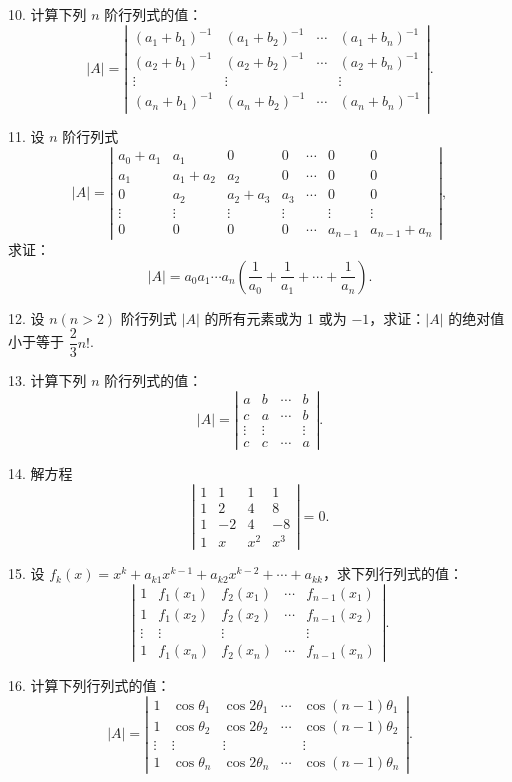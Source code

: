 \documentclass[UTF8,12pt,a4paper,fontset=fandol]{ctexart}
\begin{document}
10. 计算下列 $n$ 阶行列式的值：
\[
|A|=
\left|\begin{array}{cccc}
(a_1+b_1)^{-1}&(a_1+b_2)^{-1}&\cdots&(a_1+b_n)^{-1}\\
(a_2+b_1)^{-1}&(a_2+b_2)^{-1}&\cdots&(a_2+b_n)^{-1}\\
\vdots&\vdots&&\vdots\\
(a_n+b_1)^{-1}&(a_n+b_2)^{-1}&\cdots&(a_n+b_n)^{-1}
\end{array}\right|.
\]

11. 设 $n$ 阶行列式
\[
|A|=
\left|\begin{array}{ccccccc}
a_0+a_1&a_1&0&0&\cdots&0&0\\
a_1&a_1+a_2&a_2&0&\cdots&0&0\\
0&a_2&a_2+a_3&a_3&\cdots&0&0\\
\vdots&\vdots&\vdots&\vdots&&\vdots&\vdots\\
0&0&0&0&\cdots&a_{n-1}&a_{n-1}+a_n
\end{array}\right|,
\]
求证：
\[
|A|=a_0a_1\cdots a_n\left(\frac{1}{a_0}+\frac{1}{a_1}+\cdots+\frac{1}{a_n}\right).
\]

12. 设 $n(n>2)$ 阶行列式 $|A|$ 的所有元素或为 1 或为 $-1$，求证：$|A|$ 的绝对值小于等于 $\dfrac{2}{3}n!$.

13. 计算下列 $n$ 阶行列式的值：
\[
|A|=
\left|\begin{array}{cccc}
a&b&\cdots&b\\
c&a&\cdots&b\\
\vdots&\vdots&&\vdots\\
c&c&\cdots&a
\end{array}\right|.
\]

14. 解方程
\[
\left|\begin{array}{cccc}
1&1&1&1\\
1&2&4&8\\
1&-2&4&-8\\
1&x&x^2&x^3
\end{array}\right|=0.
\]

15. 设 $f_k(x)=x^k+a_{k1}x^{k-1}+a_{k2}x^{k-2}+\cdots+a_{kk}$，求下列行列式的值：
\[
\left|\begin{array}{ccccc}
1&f_1(x_1)&f_2(x_1)&\cdots&f_{n-1}(x_1)\\
1&f_1(x_2)&f_2(x_2)&\cdots&f_{n-1}(x_2)\\
\vdots&\vdots&\vdots&&\vdots\\
1&f_1(x_n)&f_2(x_n)&\cdots&f_{n-1}(x_n)
\end{array}\right|.
\]

16. 计算下列行列式的值：
\[
|A|=
\left|\begin{array}{ccccc}
1&\cos\theta_1&\cos2\theta_1&\cdots&\cos(n-1)\theta_1\\
1&\cos\theta_2&\cos2\theta_2&\cdots&\cos(n-1)\theta_2\\
\vdots&\vdots&\vdots&&\vdots\\
1&\cos\theta_n&\cos2\theta_n&\cdots&\cos(n-1)\theta_n
\end{array}\right|.
\]
\end{document}
